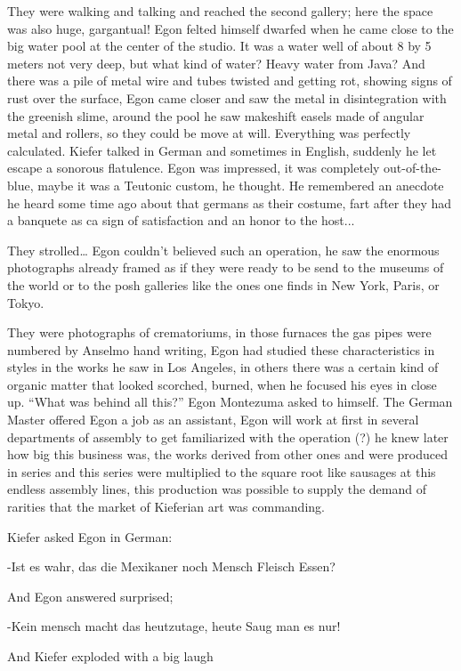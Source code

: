 \documentclass[smalldemyvopaper,11pt,twoside,onecolumn,openright,extrafontsizes]{memoir}
\begin{document}
They were walking and talking and reached the second gallery; here the space was also huge, gargantual! Egon felted himself dwarfed when he came close to the big water pool at the center of the studio. It was a water well of about 8 by 5 meters not very deep, but what kind of water? Heavy water from Java? And there was a pile of metal wire and tubes twisted and getting rot, showing signs of rust over the surface, Egon came closer and saw the metal in disintegration with the greenish slime, around the pool he saw makeshift easels made of angular metal and rollers, so they could be move at will. Everything was perfectly calculated. Kiefer talked in German and sometimes in English, suddenly he let escape a sonorous flatulence. Egon was impressed, it was completely out-of-the-blue, maybe it was a Teutonic custom, he thought. He remembered an anecdote he heard some time ago about that germans as their costume, fart after they had a banquete 
as ca sign of satisfaction and an honor to the host...

They strolled… Egon couldn’t believed such an operation, he saw the enormous photographs already framed as if they were ready to be send to the museums of the world or to the posh galleries like the ones one finds in New York, Paris, or Tokyo.

They were photographs of crematoriums, in those furnaces the gas pipes were numbered by Anselmo hand writing, Egon had studied these characteristics in styles in  the works he saw in Los Angeles, in others there was a certain kind of organic matter that looked scorched, burned, when he focused his eyes in close up. “What was behind all this?” Egon Montezuma asked to himself. The German Master offered Egon a job as an assistant, Egon will work at first in several departments of assembly to get familiarized with the operation (?) he knew later how big this business was, the works derived from other ones and were produced in series and this series were multiplied to the square root like sausages at this endless assembly lines, this production was possible to supply the demand of rarities that the market of Kieferian art was commanding.

Kiefer asked Egon in German:

-Ist es wahr, das die Mexikaner noch Mensch Fleisch Essen?

And Egon answered surprised;

-Kein mensch macht das heutzutage, heute Saug  man es nur!

And Kiefer exploded with a big laugh
\end{document}
